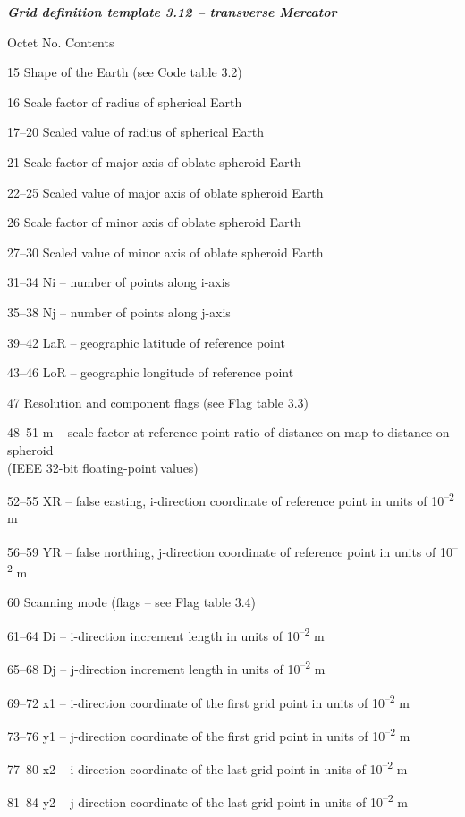 \emph{\textbf{Grid definition template 3.12 -- transverse Mercator}}

Octet No. Contents

15 Shape of the Earth (see Code table 3.2)

16 Scale factor of radius of spherical Earth

17--20 Scaled value of radius of spherical Earth

21 Scale factor of major axis of oblate spheroid Earth

22--25 Scaled value of major axis of oblate spheroid Earth

26 Scale factor of minor axis of oblate spheroid Earth

27--30 Scaled value of minor axis of oblate spheroid Earth

31--34 Ni -- number of points along i-axis

35--38 Nj -- number of points along j-axis

39--42 LaR -- geographic latitude of reference point

43--46 LoR -- geographic longitude of reference point

47 Resolution and component flags (see Flag table 3.3)

48--51 m -- scale factor at reference point ratio of distance on map to distance on spheroid\\
(IEEE 32-bit floating-point values)

52--55 XR -- false easting, i-direction coordinate of reference point in units of 10\textsuperscript{--2} m

56--59 YR -- false northing, j-direction coordinate of reference point in units of 10\textsuperscript{--2} m

60 Scanning mode (flags -- see Flag table 3.4)

61--64 Di -- i-direction increment length in units of 10\textsuperscript{--2} m

65--68 Dj -- j-direction increment length in units of 10\textsuperscript{--2} m

69--72 x1 -- i-direction coordinate of the first grid point in units of 10\textsuperscript{--2} m

73--76 y1 -- j-direction coordinate of the first grid point in units of 10\textsuperscript{--2} m

77--80 x2 -- i-direction coordinate of the last grid point in units of 10\textsuperscript{--2} m

81--84 y2 -- j-direction coordinate of the last grid point in units of 10\textsuperscript{--2} m

